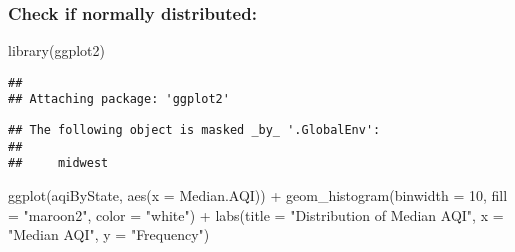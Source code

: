 \documentclass[
]{article}
\newenvironment{Shaded}{\begin{snugshade}}{\end{snugshade}}
\newcommand{\AttributeTok}[1]{\textcolor[rgb]{0.77,0.63,0.00}{#1}}
\newcommand{\DecValTok}[1]{\textcolor[rgb]{0.00,0.00,0.81}{#1}}
\newcommand{\FunctionTok}[1]{\textcolor[rgb]{0.00,0.00,0.00}{#1}}
\newcommand{\NormalTok}[1]{#1}
\newcommand{\OtherTok}[1]{\textcolor[rgb]{0.56,0.35,0.01}{#1}}
\newcommand{\SpecialCharTok}[1]{\textcolor[rgb]{0.00,0.00,0.00}{#1}}
\newcommand{\StringTok}[1]{\textcolor[rgb]{0.31,0.60,0.02}{#1}}
\begin{document}
\begin{Shaded}
\end{Shaded}

\hypertarget{check-if-normally-distributed}{%
\subsubsection{Check if normally
distributed:}\label{check-if-normally-distributed}}

\begin{Shaded}
\begin{Highlighting}[]
\FunctionTok{library}\NormalTok{(ggplot2)}
\end{Highlighting}
\end{Shaded}

\begin{verbatim}
## 
## Attaching package: 'ggplot2'
\end{verbatim}

\begin{verbatim}
## The following object is masked _by_ '.GlobalEnv':
## 
##     midwest
\end{verbatim}

\begin{Shaded}
\begin{Highlighting}[]
\FunctionTok{ggplot}\NormalTok{(aqiByState, }\FunctionTok{aes}\NormalTok{(}\AttributeTok{x =}\NormalTok{ Median.AQI)) }\SpecialCharTok{+}
  \FunctionTok{geom\_histogram}\NormalTok{(}\AttributeTok{binwidth =} \DecValTok{10}\NormalTok{, }\AttributeTok{fill =} \StringTok{"maroon2"}\NormalTok{, }\AttributeTok{color =} \StringTok{"white"}\NormalTok{) }\SpecialCharTok{+}
  \FunctionTok{labs}\NormalTok{(}\AttributeTok{title =} \StringTok{"Distribution of Median AQI"}\NormalTok{,}
       \AttributeTok{x =} \StringTok{"Median AQI"}\NormalTok{, }\AttributeTok{y =} \StringTok{"Frequency"}\NormalTok{)}
\end{Highlighting}
\end{Shaded}
\end{document}
